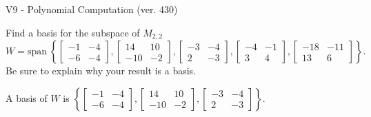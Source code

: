 \begin{exercise}
  \begin{exerciseTitle}V9 - Polynomial Computation (ver. 430)\end{exerciseTitle}
  \begin{exerciseStatement}
    Find a basis for the subspace of \(M_{2,2}\) 
\[W=\mathrm{span}\ \left\{\left[\begin{array}{cc}
-1 & -4 \\
-6 & -4
\end{array}\right] , \left[\begin{array}{cc}
14 & 10 \\
-10 & -2
\end{array}\right] , \left[\begin{array}{cc}
-3 & -4 \\
2 & -3
\end{array}\right] , \left[\begin{array}{cc}
-4 & -1 \\
3 & 4
\end{array}\right] , \left[\begin{array}{cc}
-18 & -11 \\
13 & 6
\end{array}\right]\right\}.\]
 Be sure to explain why your result is a basis.


  \end{exerciseStatement}
  \begin{exerciseAnswer}
   A basis of \(W\) is  \(\left\{\left[\begin{array}{cc}
-1 & -4 \\
-6 & -4
\end{array}\right] , \left[\begin{array}{cc}
14 & 10 \\
-10 & -2
\end{array}\right] , \left[\begin{array}{cc}
-3 & -4 \\
2 & -3
\end{array}\right]\right\}\).
  


  \end{exerciseAnswer}
\end{exercise}